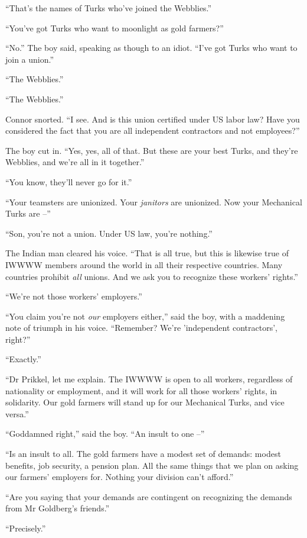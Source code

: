 ``That's the names of Turks who've joined the Webblies.''

``You've got Turks who want to moonlight as gold farmers?''

``No.'' The boy said, speaking as though to an idiot. ``I've got Turks
who want to join a union.''

``The Webblies.''

``The Webblies.''

Connor snorted. ``I see. And is this union certified under US labor
law? Have you considered the fact that you are all independent
contractors and not employees?''

The boy cut in. ``Yes, yes, all of that. But these are your best
Turks, and they're Webblies, and we're all in it together.''

``You know, they'll never go for it.''

``Your teamsters are unionized. Your \emph{janitors} are unionized.
Now your Mechanical Turks are --''

``Son, you're not a union. Under US law, you're nothing.''

The Indian man cleared his voice. ``That is all true, but this is
likewise true of IWWWW members around the world in all their
respective countries. Many countries prohibit \emph{all} unions.
And we ask you to recognize these workers' rights.''

``We're not those workers' employers.''

``You claim you're not \emph{our} employers either,'' said the boy,
with a maddening note of triumph in his voice. ``Remember? We're
'independent contractors', right?''

``Exactly.''

``Dr Prikkel, let me explain. The IWWWW is open to all workers,
regardless of nationality or employment, and it will work for all
those workers' rights, in solidarity. Our gold farmers will stand
up for our Mechanical Turks, and vice versa.''

``Goddamned right,'' said the boy. ``An insult to one --''

``Is an insult to all. The gold farmers have a modest set of
demands: modest benefits, job security, a pension plan. All the
same things that we plan on asking our farmers' employers for.
Nothing your division can't afford.''

``Are you saying that your demands are contingent on recognizing the
demands from Mr Goldberg's friends.''

``Precisely.''

